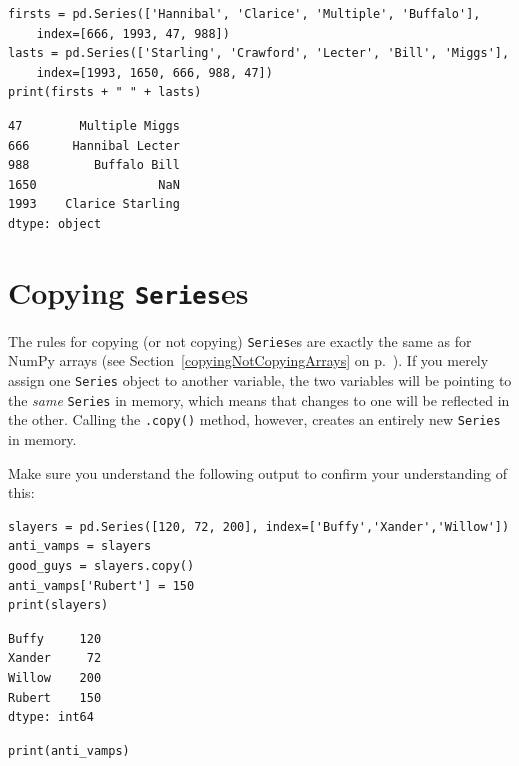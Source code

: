 \begin{Verbatim}[fontsize=\small,samepage=true,frame=single,framesep=3mm]
firsts = pd.Series(['Hannibal', 'Clarice', 'Multiple', 'Buffalo'],
    index=[666, 1993, 47, 988])
lasts = pd.Series(['Starling', 'Crawford', 'Lecter', 'Bill', 'Miggs'],
    index=[1993, 1650, 666, 988, 47])
print(firsts + " " + lasts)
\end{Verbatim}

\begin{Verbatim}[fontsize=\small,samepage=true,frame=leftline,framesep=5mm,framerule=1mm]
47        Multiple Miggs
666      Hannibal Lecter
988         Buffalo Bill
1650                 NaN
1993    Clarice Starling
dtype: object
\end{Verbatim}

\section{Copying \texttt{Series}es}

The rules for copying (or not copying) \texttt{Series}es are exactly the same
as for NumPy arrays (see Section~\ref{copyingNotCopyingArrays} on
p.~\pageref{copyingNotCopyingArrays}). If you merely assign one \texttt{Series}
object to another variable, the two variables will be pointing to the
\textit{same} \texttt{Series} in memory, which means that changes to one will
be reflected in the other. Calling the \texttt{.copy()} method, however,
creates an entirely new \texttt{Series} in memory.

Make sure you understand the following output to confirm your understanding of
this:

\begin{Verbatim}[fontsize=\scriptsize,samepage=true,frame=single,framesep=3mm]
slayers = pd.Series([120, 72, 200], index=['Buffy','Xander','Willow'])
anti_vamps = slayers
good_guys = slayers.copy()
anti_vamps['Rubert'] = 150
print(slayers)
\end{Verbatim}
\vspace{-.3in}

\begin{Verbatim}[fontsize=\scriptsize,samepage=true,frame=leftline,framesep=5mm,framerule=1mm]
Buffy     120
Xander     72
Willow    200
Rubert    150
dtype: int64
\end{Verbatim}

\begin{Verbatim}[fontsize=\scriptsize,samepage=true,frame=single,framesep=3mm]
print(anti_vamps)
\end{Verbatim}
\vspace{-.3in}

